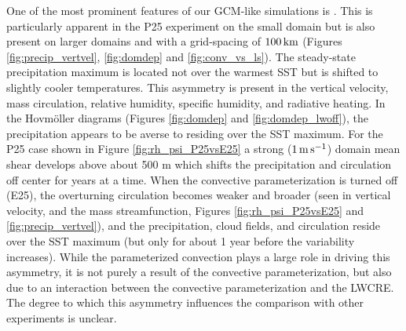 \documentclass[draft]{agujournal2019}
\begin{document}
One of the most prominent features of our GCM-like simulations is .  
This  is particularly apparent in the P25 experiment on the small domain but is also present on larger domains and 
with a grid-spacing of $100 \, \rm{km}$ (Figures  \ref{fig:precip_vertvel}, \ref{fig:domdep} and  \ref{fig:conv_vs_ls}). 
The steady-state precipitation maximum is located  not over the warmest SST but is shifted to slightly cooler temperatures.  
This asymmetry is present in the vertical velocity, mass circulation, relative humidity, specific humidity, and radiative heating.  
In the Hovm{\"o}ller diagrams (Figures \ref{fig:domdep} and \ref{fig:domdep_lwoff}), the precipitation appears to be averse 
to residing over the SST maximum.  
For the P25 case shown in Figure \ref{fig:rh_psi_P25vsE25} a strong ($1 \, \rm{m \, s^{-1}}$) domain
mean shear develops above about 500 m which shifts the precipitation and circulation off center for years at a time.  
When the convective parameterization is turned off (E25), the overturning circulation 
becomes weaker and broader (seen in vertical velocity, and the mass streamfunction, Figures \ref{fig:rh_psi_P25vsE25} and \ref{fig:precip_vertvel}), 
and the precipitation, cloud fields, and circulation reside over the SST maximum (but only for about 1 year before the variability 
increases).    
While the parameterized convection plays a large role in driving this asymmetry, it is not purely a 
result of the convective parameterization, but also due to an interaction between the convective 
parameterization and the LWCRE.   The degree to which this asymmetry influences the comparison with other 
experiments is unclear.     


%
%
%
\end{document}
